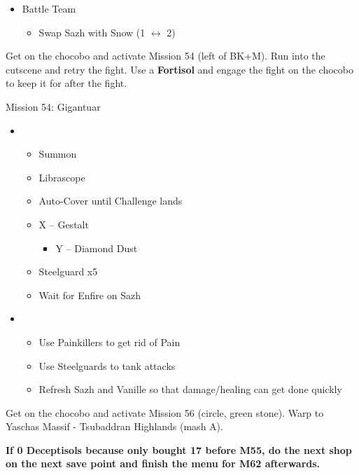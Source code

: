 \begin{menu}
	\begin{itemize}
	\paradigm
		\begin{itemize}
			\item Battle Team
				\begin{itemize}
					\item Swap Sazh with Snow (1 $\leftrightarrow$ 2)
				\end{itemize}
		\end{itemize}
	\end{itemize}
\end{menu}

Get on the chocobo and activate Mission 54 (left of BK+M).
Run into the cutscene and retry the fight.
Use a \textbf{Fortisol} and engage the fight on the chocobo to keep it for after the fight.

\begin{battle}{Mission 54: Gigantuar}
	\begin{itemize}
		\item \fifth
			\begin{itemize}
				\item Summon
				\item Librascope
				\item Auto-Cover until Challenge lands
				\item X -- Gestalt
					\begin{itemize}
						\item Y -- Diamond Dust
					\end{itemize}
				\item Steelguard x5
				\item Wait for Enfire on Sazh
			\end{itemize}
		\item \fourth
			\begin{itemize}
				\item Use Painkillers to get rid of Pain
				\item Use Steelguards to tank attacks
				\item Refresh Sazh and Vanille so that damage/healing can get done quickly
			\end{itemize}
	\end{itemize}
\end{battle}

Get on the chocobo and activate Mission 56 (circle, green stone).
Warp to Yaschas Massif - Tsubaddran Highlands (mash A).

\textbf{If 0 Deceptisols because only bought 17 before M55, do the next shop on the next save point and finish the menu for M62 afterwards.}

